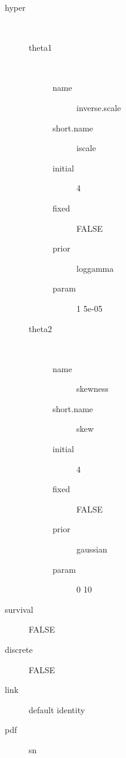 \begin{description}
	\item[hyper]\ 
	 \begin{description}
	 	\item[theta1]\ 
	 	 \begin{description}
	 	 	\item[name] inverse.scale
	 	 	\item[short.name] iscale
	 	 	\item[initial] 4
	 	 	\item[fixed] FALSE
	 	 	\item[prior] loggamma
	 	 	\item[param] 1 5e-05
	 	 \end{description}
	 	\item[theta2]\ 
	 	 \begin{description}
	 	 	\item[name] skewness
	 	 	\item[short.name] skew
	 	 	\item[initial] 4
	 	 	\item[fixed] FALSE
	 	 	\item[prior] gaussian
	 	 	\item[param] 0 10
	 	 \end{description}
	 \end{description}
	\item[survival] FALSE
	\item[discrete] FALSE
	\item[link] default identity
	\item[pdf] sn
\end{description}
